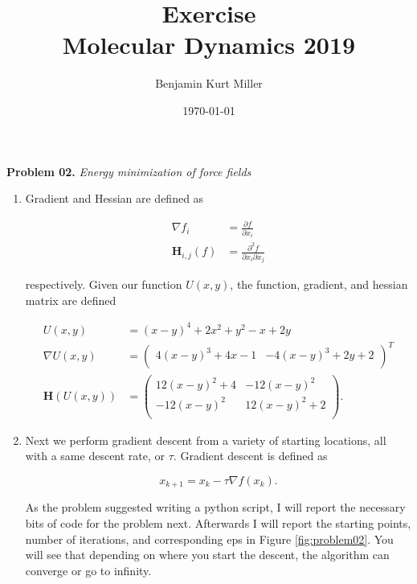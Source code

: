 \documentclass{article}
\title{Exercise \exnum \\ 
    Molecular Dynamics 2019}
\author{Benjamin Kurt Miller}
\date{\today}
\newcommand{\exnum}{02} %
\newcounter{problem}[section]
\newenvironment{prob}[1]
{
    \refstepcounter{problem}
    \Large{\textbf{Problem \exnum.\theproblem}  \qquad \textit{#1}}
    \begin{enumerate}[label=\alph*]
    \normalsize
}{
    \end{enumerate}
}
\begin{document}
\maketitle


\begin{prob}{Energy minimization of force fields}
\item Gradient and Hessian are defined as 

\begin{align*}
    \nabla f_{i} &= \frac{\partial f}{\partial x_{i}} \\
    \mathbf{H}_{i,j}(f) &= \frac{\partial^{2} f}{\partial x_{i} \partial x_{j}}
\end{align*}

respectively. Given our function $U(x, y)$, the function, gradient, and hessian matrix are defined

\begin{align}
    U(x,y) &= (x - y)^{4} + 2x^{2} + y^{2} - x + 2y \\
    \nabla U(x,y) &=
    \begin{pmatrix}
        4(x-y)^{3} + 4x - 1 & -4(x-y)^{3} + 2y + 2 \\
    \end{pmatrix}^{T} \\
    \mathbf{H}(U(x,y)) &= 
    \begin{pmatrix}
        12(x-y)^{2} + 4 & -12(x-y)^{2} \\
        -12(x-y)^{2} & 12(x-y)^{2} + 2 \\
    \end{pmatrix}.
\end{align}

\item 

Next we perform gradient descent from a variety of starting locations, all with a same descent rate, or $\tau$. Gradient descent is defined as 

\begin{equation}
	x_{k+1} = x_{k} - \tau \nabla f(x_{k}).
\end{equation}

As the problem suggested writing a python script, I will report the necessary bits of code for the problem next. Afterwards I will report the starting points, number of iterations, and corresponding eps in Figure \ref{fig:problem02}. You will see that depending on where you start the descent, the algorithm can converge or go to infinity.

\clearpage
\begin{lstlisting}[frame=single]  % Start your code-block


\end{lstlisting}
\end{prob}
\end{document}
